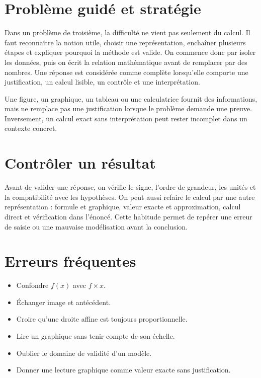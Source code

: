 \section{Problème guidé et stratégie}
Dans un problème de troisième, la difficulté ne vient pas seulement du calcul. Il faut reconnaître la notion utile, choisir une représentation, enchaîner plusieurs étapes et expliquer pourquoi la méthode est valide. On commence donc par isoler les données, puis on écrit la relation mathématique avant de remplacer par des nombres. Une réponse est considérée comme complète lorsqu’elle comporte une justification, un calcul lisible, un contrôle et une interprétation.

\begin{attention}
Une figure, un graphique, un tableau ou une calculatrice fournit des informations, mais ne remplace pas une justification lorsque le problème demande une preuve. Inversement, un calcul exact sans interprétation peut rester incomplet dans un contexte concret.
\end{attention}

\section{Contrôler un résultat}
Avant de valider une réponse, on vérifie le signe, l’ordre de grandeur, les unités et la compatibilité avec les hypothèses. On peut aussi refaire le calcul par une autre représentation : formule et graphique, valeur exacte et approximation, calcul direct et vérification dans l’énoncé. Cette habitude permet de repérer une erreur de saisie ou une mauvaise modélisation avant la conclusion.

\section{Erreurs fréquentes}
\begin{itemize}
\item Confondre $f(x)$ avec $f\times x$.
\item Échanger image et antécédent.
\item Croire qu’une droite affine est toujours proportionnelle.
\item Lire un graphique sans tenir compte de son échelle.
\item Oublier le domaine de validité d’un modèle.
\item Donner une lecture graphique comme valeur exacte sans justification.
\end{itemize}

